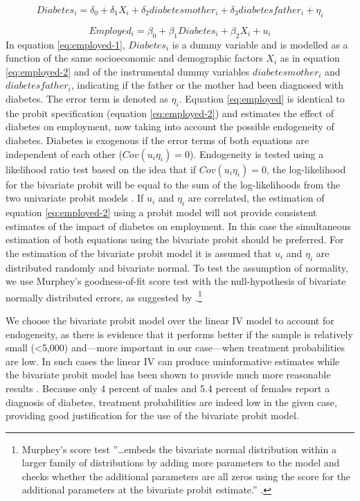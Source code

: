 \begin{equation}
Diabetes_{i}=\delta_{0}+\delta_{1}X_{i}+\delta_{2}diabetesmother_{i}+\delta_{3}diabetesfather_{i}+\eta_{i}\label{eq:employed-1}
\end{equation}



\begin{equation}
Employed_{i}=\beta_{0}+\beta_{1}Diabetes_{i}+\beta_{2}X_{i}+u_{i}\label{eq:employed}
\end{equation}
In equation \ref{eq:employed-1}, $Diabetes_{i}$
is a dummy variable and is modelled as a function of the same socioeconomic
and demographic factors $X_{i}$ as in equation \ref{eq:employed-2}
and of the instrumental dummy variables $diabetesmother_{i}$ and
$diabetesfather_{i}$, indicating if the father or the mother had
been diagnosed with diabetes. The error term is denoted as $\eta_{i}$.
Equation \ref{eq:employed} is identical to the probit specification
(equation \ref{eq:employed-2}) and estimates the effect of diabetes
on employment, now taking into account the possible endogeneity of
diabetes. Diabetes is exogenous if the error terms of both equations
are independent of each other ($Cov(u_{i}\eta_{i})=0$). Endogeneity
is tested using a likelihood ratio test based on the idea that if
$Cov(u_{i}\eta_{i})=0$, the log-likelihood for the bivariate probit
will be equal to the sum of the log-likelihoods from the two univariate
probit models \parencite{Knapp1998}. If $u_{i}$ 
 and $\eta_{i}$ are correlated, the estimation of equation \ref{eq:employed-2}
using a probit model will not provide consistent estimates of the
impact of diabetes on employment. In this case the simultaneous estimation
of both equations using the bivariate probit should be preferred.
For the estimation of the bivariate probit model it is assumed that
$u_{i}$ 
 and $\eta_{i}$ are distributed randomly and bivariate normal. To
test the assumption of normality, we use Murphey's goodness-of-fit
score test with the null-hypothesis of bivariate normally distributed
errors, as suggested by \textcite{Chiburis2012}.\footnote{Murphey's score test ''\ldots{}embeds the bivariate normal distribution
within a larger family of distributions by adding more parameters
to the model and checks whether the additional parameters are all
zeros using the score for the additional parameters at the bivariate
probit estimate.'' \parencite[p. 19]{Chiburis2012}.}

We choose the bivariate probit model over the linear \ac{IV}
model to account for endogeneity, as there is evidence that it performs
better if the sample is relatively small (<5,000) and---more important
in our case---when treatment probabilities are low. In such cases
the linear \ac{IV} can produce uninformative estimates while the
bivariate probit model has been shown to provide much more reasonable
results \parencite{Chiburis2012}. Because only 4 percent of males and
5.4 percent of females report a diagnosis of diabetes, treatment probabilities
are indeed low in the given case, providing good justification for
the use of the bivariate probit model. 

